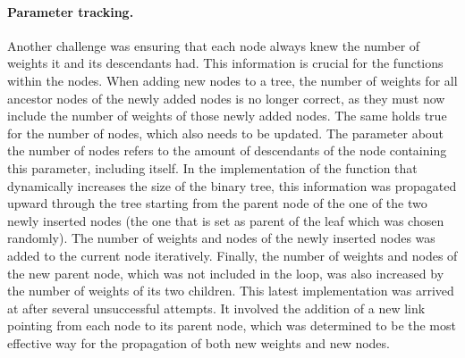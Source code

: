 \paragraph{Parameter tracking.}
Another challenge was ensuring that each node always knew the number of weights it and its descendants had. This information is crucial for the functions within the nodes. When adding new nodes to a tree, the number of weights for all ancestor nodes of the newly added nodes is no longer correct, as they must now include the number of weights of those newly added nodes. The same holds true for the number of nodes, which also needs to be updated. The parameter about the number of nodes refers to the amount of descendants of the node containing this parameter, including itself. In the implementation of the function that dynamically increases the size of the binary tree, this information was propagated upward through the tree starting from the parent node of the one of the two newly inserted nodes (the one that is set as parent of the leaf which was chosen randomly). The number of weights and nodes of the newly inserted nodes was added to the current node iteratively. Finally, the number of weights and nodes of the new parent node, which was not included in the loop, was also increased by the number of weights of its two children. This latest implementation was arrived at after several unsuccessful attempts. It involved the addition of a new link pointing from each node to its parent node, which was determined to be the most effective way for the propagation of both new weights and new nodes.